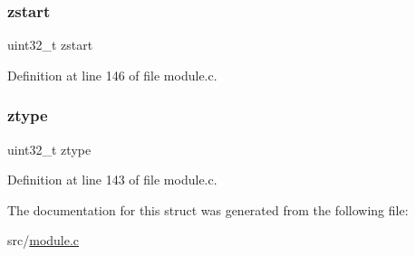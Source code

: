 \subsubsection{\texorpdfstring{zstart}{zstart}}
{\footnotesize\ttfamily uint32\+\_\+t zstart}



Definition at line 146 of file module.\+c.

\mbox{\label{struct_redis_module_key_a7f0f33d3cd7a75ecb32808d59da191a5}} 
\subsubsection{\texorpdfstring{ztype}{ztype}}
{\footnotesize\ttfamily uint32\+\_\+t ztype}



Definition at line 143 of file module.\+c.



The documentation for this struct was generated from the following file\+:\begin{DoxyCompactItemize}
\item 
src/\hyperlink{module_8c}{module.\+c}\end{DoxyCompactItemize}
